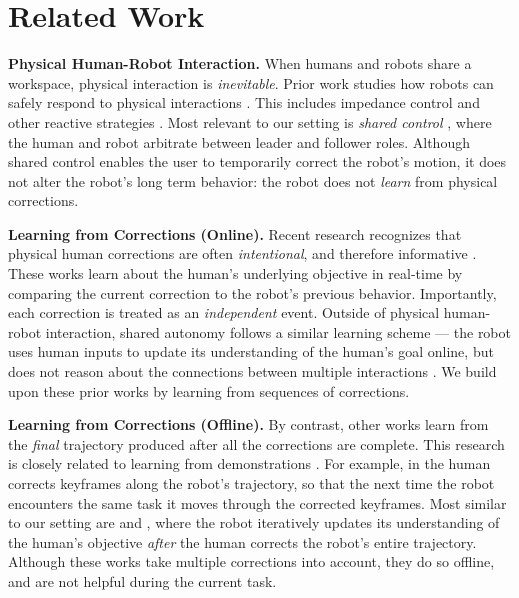 \section{Related Work}
\label{sec:related_work}

\noindent\textbf{Physical Human-Robot Interaction.} When humans and robots share a workspace, physical interaction is \textit{inevitable}. Prior work studies how robots can safely respond to physical interactions \cite{haddadin2016physical, de2008atlas, ikemoto2012physical}. This includes impedance control \cite{hogan1985impedance} and other reactive strategies \cite{haddadin2008collision}. Most relevant to our setting is \textit{shared control} \cite{li2015continuous, losey2018review, abbink2018topology, mortl2012role}, where the human and robot arbitrate between leader and follower roles. Although shared control enables the user to temporarily correct the robot's motion, it does not alter the robot's long term behavior: the robot does not \textit{learn} from physical corrections.

\smallskip

\noindent\textbf{Learning from Corrections (Online).} Recent research recognizes that physical human corrections are often \textit{intentional}, and therefore informative \cite{bajcsy2017learning, bajcsy2018learning, losey2018including, bobu2020quantifying}. These works learn about the human's underlying objective in real-time by comparing the current correction to the robot's previous behavior. Importantly, each correction is treated as an \textit{independent} event. Outside of physical human-robot interaction, shared autonomy follows a similar learning scheme --- the robot uses human inputs to update its understanding of the human's goal online, but does not reason about the connections between multiple interactions \cite{javdani2018shared, dragan2013policy, jain2019probabilistic,jeon2020shared}. We build upon these prior works by learning from sequences of corrections.


\smallskip

\noindent\textbf{Learning from Corrections (Offline).} By contrast, other works learn from the \textit{final} trajectory produced after all the corrections are complete. This research is closely related to learning from demonstrations \cite{argall2009survey}. For example, in \cite{akgun2012keyframe} the human corrects keyframes along the robot's trajectory, so that the next time the robot encounters the same task it moves through the corrected keyframes. Most similar to our setting are \cite{jain2015learning} and \cite{ratliff2006maximum}, where the robot iteratively updates its understanding of the human's objective \textit{after} the human corrects the robot's entire trajectory. Although these works take multiple corrections into account, they do so offline, and are not helpful during the current task.

